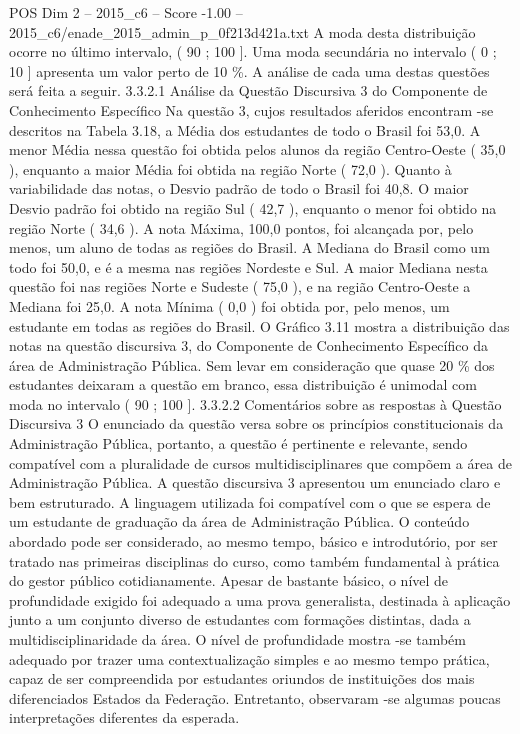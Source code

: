\begin{textsample}{POS Dim 2 – 2015\_c6 – Score -1.00 – 2015\_c6/enade\_2015\_admin\_p\_0f213d421a.txt}
A moda desta distribuição ocorre no último intervalo, ( 90 ; 100 ].
Uma moda secundária no intervalo ( 0 ; 10 ] apresenta um valor perto de 10 \%.
A análise de cada uma destas questões será feita a seguir. 3.3.2.1 Análise da Questão Discursiva 3 do Componente de Conhecimento Específico Na questão 3, cujos resultados aferidos encontram -se descritos na Tabela 3.18, a Média dos estudantes de todo o Brasil foi 53,0.
A menor Média nessa questão foi obtida pelos alunos da região Centro-Oeste ( 35,0 ), enquanto a maior Média foi obtida na região Norte ( 72,0 ).
Quanto à variabilidade das notas, o Desvio padrão de todo o Brasil foi 40,8.
O maior Desvio padrão foi obtido na região Sul ( 42,7 ), enquanto o menor foi obtido na região Norte ( 34,6 ).
A nota Máxima, 100,0 pontos, foi alcançada por, pelo menos, um aluno de todas as regiões do Brasil.
A Mediana do Brasil como um todo foi 50,0, e é a mesma nas regiões Nordeste e Sul.
A maior Mediana nesta questão foi nas regiões Norte e Sudeste ( 75,0 ), e na região Centro-Oeste a Mediana foi 25,0.
A nota Mínima ( 0,0 ) foi obtida por, pelo menos, um estudante em todas as regiões do Brasil.
O Gráfico 3.11 mostra a distribuição das notas na questão discursiva 3, do Componente de Conhecimento Específico da área de Administração Pública.
Sem levar em consideração que quase 20 \% dos estudantes deixaram a questão em branco, essa distribuição é unimodal com moda no intervalo ( 90 ; 100 ]. 3.3.2.2 Comentários sobre as respostas à Questão Discursiva 3 O enunciado da questão versa sobre os princípios constitucionais da Administração Pública, portanto, a questão é pertinente e relevante, sendo compatível com a pluralidade de cursos multidisciplinares que compõem a área de Administração Pública.
A questão discursiva 3 apresentou um enunciado claro e bem estruturado.
A linguagem utilizada foi compatível com o que se espera de um estudante de graduação da área de Administração Pública.
O conteúdo abordado pode ser considerado, ao mesmo tempo, básico e introdutório, por ser tratado nas primeiras disciplinas do curso, como também fundamental à prática do gestor público cotidianamente.
Apesar de bastante básico, o nível de profundidade exigido foi adequado a uma prova generalista, destinada à aplicação junto a um conjunto diverso de estudantes com formações distintas, dada a multidisciplinaridade da área.
O nível de profundidade mostra -se também adequado por trazer uma contextualização simples e ao mesmo tempo prática, capaz de ser compreendida por estudantes oriundos de instituições dos mais diferenciados Estados da Federação.
Entretanto, observaram -se algumas poucas interpretações diferentes da esperada.

\end{textsample}
